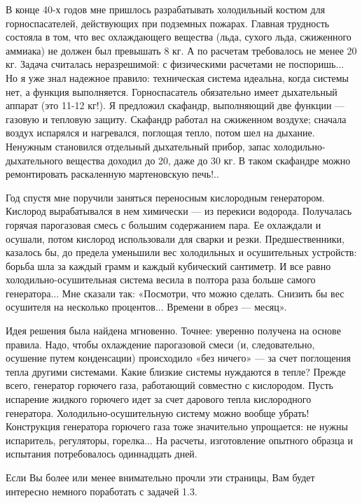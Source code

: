 В  конце  40-х годов  мне  пришлось  разрабатывать холодильный  костюм
для  горноспасателей,  действующих   при  подземных  пожарах.  Главная
трудность состояла в том, что  вес охлаждающего вещества (льда, сухого
льда,  сжиженного  аммиака)  не  должен  был  превышать  8  кг.  А  по
расчетам требовалось  не менее  20 кг. Задача  считалась неразрешимой:
с  физическими  расчетами  не  поспоришь... Но  я  уже  знал  надежное
правило: техническая  система идеальна,  когда системы нет,  а функция
выполняется. Горноспасатель обязательно имеет дыхательный аппарат (это
11-12 кг!). Я предложил скафандр,  выполняющий две функции — газовую и
тепловую защиту. Скафандр работал на сжиженном воздухе; сначала воздух
испарялся и нагревался, поглощая тепло, потом шел на дыхание. Ненужным
становился отдельный дыхательный прибор, запас холодильно-дыхательного
вещества  доходил до  20,  даже  до 30  кг.  В  таком скафандре  можно
ремонтировать раскаленную мартеновскую печь!..

Год спустя  мне поручили заняться переносным  кислородным генератором.
Кислород  вырабатывался  в  нем  химически  —  из  перекиси  водорода.
Получалась горячая  парогазовая смесь  с большим содержанием  пара. Ее
охлаждали и осушали,  потом кислород использовали для  сварки и резки.
Предшественники, казалось  бы, до предела уменьшили  вес холодильных и
осушительных устройств: борьба шла за каждый грамм и каждый кубический
сантиметр.  И  все  равно  холодильно-осушительная  система  весила  в
полтора раза  больше самого генератора... Мне  сказали так: «Посмотри,
что можно сделать. Снизить бы  вес осушителя на несколько процентов...
Времени в обрез — месяц».

Идея  решения  была  найдена   мгновенно.  Точнее:  уверенно  получена
на  основе  правила.  Надо,  чтобы охлаждение  парогазовой  смеси  (и,
следовательно, осушение путем конденсации)  происходило «без ничего» —
за  счет поглощения  тепла  другими системами.  Какие близкие  системы
нуждаются в  тепле? Прежде всего, генератор  горючего газа, работающий
совместно  с  кислородом. Пусть  испарение  жидкого  горючего идет  за
счет дарового  тепла кислородного  генератора. Холодильно-осушительную
систему можно вообще убрать! Конструкция генератора горючего газа тоже
значительно упрощается: не нужны испаритель, регуляторы, горелка... На
расчеты,  изготовление  опытного  образца  и  испытания  потребовалось
одиннадцать дней.


Если Вы  более или  менее внимательно прочли  эти страницы,  Вам будет
интересно немного поработать с задачей 1.3.


